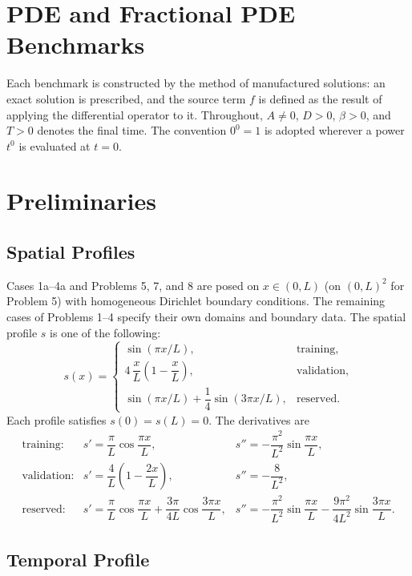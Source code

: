 \documentclass[11pt]{article}
\begin{document}
\section*{PDE and Fractional PDE Benchmarks}

Each benchmark is constructed by the method of manufactured solutions: an
exact solution is prescribed, and the source term $f$ is defined as the
result of applying the differential operator to it. Throughout, $A\neq0$,
$D>0$, $\beta>0$, and $T>0$ denotes the final time. The convention $0^0=1$
is adopted wherever a power $t^0$ is evaluated at $t=0$.

\section{Preliminaries}

\subsection{Spatial Profiles}

Cases 1a--4a and Problems 5, 7, and 8 are posed on $x\in(0,L)$ (on
$(0,L)^2$ for Problem 5) with homogeneous Dirichlet boundary conditions.
The remaining cases of Problems 1--4 specify their own domains and
boundary data. The spatial
profile $s$ is one of the following:
\[
s(x)=
\begin{cases}
\sin(\pi x/L),
& \text{training},\\[4pt]
4\,\dfrac{x}{L}\left(1-\dfrac{x}{L}\right),
& \text{validation},\\[6pt]
\sin(\pi x/L)+\dfrac14\sin(3\pi x/L),
& \text{reserved}.
\end{cases}
\]
Each profile satisfies $s(0)=s(L)=0$. The derivatives are
\[
\begin{array}{lll}
\text{training:} &
s'=\dfrac{\pi}{L}\cos\dfrac{\pi x}{L}, &
s''=-\dfrac{\pi^2}{L^2}\sin\dfrac{\pi x}{L},\\[10pt]
\text{validation:} &
s'=\dfrac{4}{L}\left(1-\dfrac{2x}{L}\right), &
s''=-\dfrac{8}{L^2},\\[10pt]
\text{reserved:} &
s'=\dfrac{\pi}{L}\cos\dfrac{\pi x}{L}+\dfrac{3\pi}{4L}\cos\dfrac{3\pi x}{L}, &
s''=-\dfrac{\pi^2}{L^2}\sin\dfrac{\pi x}{L}-\dfrac{9\pi^2}{4L^2}\sin\dfrac{3\pi x}{L}.
\end{array}
\]

\subsection{Temporal Profile}
\end{document}
